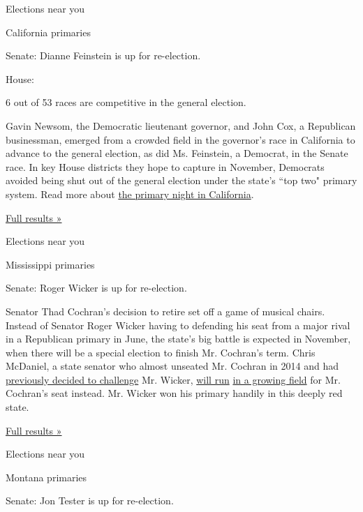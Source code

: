 Elections near you

California primaries

Senate: Dianne Feinstein is up for re-election.

House:

6 out of 53 races are competitive in the general election.

Gavin Newsom, the Democratic lieutenant governor, and John Cox, a
Republican businessman, emerged from a crowded field in the governor's
race in California to advance to the general election, as did Ms.
Feinstein, a Democrat, in the Senate race. In key House districts they
hope to capture in November, Democrats avoided being shut out of the
general election under the state's ``top two" primary system. Read more
about
\href{https://www.nytimes3xbfgragh.onion/2018/06/06/us/politics/california-primary.html}{the
primary night in California}.

\href{https://www.nytimes3xbfgragh.onion/interactive/2018/06/05/us/elections/results-california-primary-elections.html}{Full
results »}

Elections near you

Mississippi primaries

Senate: Roger Wicker is up for re-election.

Senator Thad Cochran's decision to retire set off a game of musical
chairs. Instead of Senator Roger Wicker having to defending his seat
from a major rival in a Republican primary in June, the state's big
battle is expected in November, when there will be a special election to
finish Mr. Cochran's term. Chris McDaniel, a state senator who almost
unseated Mr. Cochran in 2014 and had
\href{https://www.nytimes3xbfgragh.onion/2018/02/26/us/politics/mississippi-mcdaniel-wicker-primary-fight.html}{previously
decided to challenge} Mr. Wicker,
\href{https://www.nytimes3xbfgragh.onion/2018/03/16/us/politics/bannon-republican-senate-primary-challengers.html}{will
run}
\href{https://www.nytimes3xbfgragh.onion/2018/03/20/us/politics/mississippi-senate-appointee-trump.html}{in
a growing field} for Mr. Cochran's seat instead. Mr. Wicker won his
primary handily in this deeply red state.

\href{https://www.nytimes3xbfgragh.onion/interactive/2018/06/05/us/elections/results-mississippi-primary-elections.html}{Full
results »}

Elections near you

Montana primaries

Senate: Jon Tester is up for re-election.


